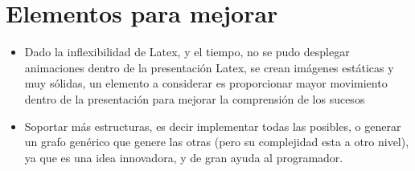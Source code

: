 \documentclass[12pt,letterpaper]{article}     %
\begin{document}
\section{Elementos para mejorar}

\begin{itemize}

\item Dado la inflexibilidad de Latex, y el tiempo, no se pudo desplegar animaciones dentro de la presentación Latex, se crean imágenes estáticas y muy sólidas, un elemento a considerar es proporcionar mayor movimiento dentro de la presentación para mejorar la comprensión de los sucesos

\item Soportar más estructuras, es decir implementar todas las posibles, o generar un grafo genérico que genere las otras (pero su complejidad esta a otro nivel), ya que es una idea innovadora, y de gran ayuda al programador.

\end{itemize}
\end{document}
